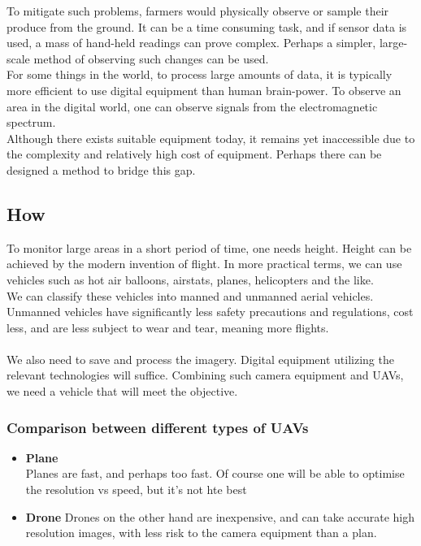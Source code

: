 \noindent
To mitigate such problems, farmers would physically observe or sample their produce from the ground. It can be a time consuming task, and if sensor data is used, a mass of hand-held readings can prove complex. Perhaps a simpler, large-scale method of observing such changes can be used.\\

\noindent
For some things in the world, to process large amounts of data, it is typically more efficient to use digital equipment than human brain-power. To observe an area in the digital world, one can observe signals from the electromagnetic spectrum.\\

\noindent
Although there exists suitable equipment today, it remains yet inaccessible due to the complexity and relatively high cost of equipment. Perhaps there can be designed a method to bridge this gap.

\subsection{How}

To monitor large areas in a short period of time, one needs height. Height can be achieved by the modern invention of flight. In more practical terms, we can use vehicles such as hot air balloons, airstats, planes, helicopters and the like.\\

\noindent
We can classify these vehicles into manned and unmanned aerial vehicles. Unmanned vehicles have significantly less safety precautions and regulations, cost less, and are less subject to wear and tear, meaning more flights.\\\\

\noindent
We also need to save and process the imagery. Digital equipment utilizing the relevant technologies will suffice. Combining such camera equipment and UAVs, we need a vehicle that will meet the objective.

\subsubsection{Comparison between different types of UAVs}

\begin{itemize}
    \item \textbf{Plane}\\
    Planes are fast, and perhaps too fast. Of course one will be able to optimise the resolution vs speed, but it's not hte best
    \item \textbf{Drone}
    Drones on the other hand are inexpensive, and can take accurate high resolution images, with less risk to the camera equipment than a plan.
\end{itemize}

